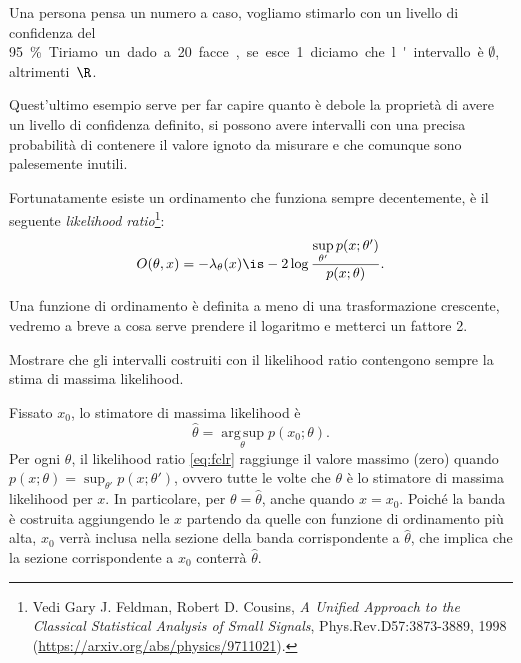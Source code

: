 \begin{example}
	Una persona pensa un numero a caso,
	vogliamo stimarlo con un livello di confidenza del \SI{95}\%.
	Tiriamo un dado a 20 facce,
	se esce 1 diciamo che l'intervallo è $\emptyset$, altrimenti~$\R$.
\end{example}

Quest'ultimo esempio serve per far capire quanto è debole la proprietà di
avere un livello di confidenza definito, si possono avere intervalli con una
precisa probabilità di contenere il valore ignoto da misurare e che comunque
sono palesemente inutili.

Fortunatamente esiste un ordinamento che funziona sempre decentemente, è il
seguente \emph{likelihood ratio}\footnote{Vedi Gary J. Feldman, Robert D. Cousins,
\emph{A Unified Approach to the Classical Statistical Analysis of Small
Signals}, Phys.Rev.D57:3873-3889, 1998
(\url{https://arxiv.org/abs/physics/9711021}).}:
%
\begin{equation} \label{eq:fclr}
	O(\theta,x) = -\lambda_\theta(x)
	\is -2\log\frac {\sup\limits_{\theta'} p(x;\theta')} {p(x;\theta)}.
\end{equation}

Una funzione di ordinamento è definita a meno di una trasformazione crescente,
vedremo a breve a cosa serve prendere il logaritmo e metterci un fattore 2.

\begin{exercise}
    Mostrare che gli intervalli costruiti con il likelihood ratio contengono
    sempre la stima di massima likelihood.
\end{exercise}

\begin{solution}
    Fissato $x_0$, lo stimatore di massima likelihood è
    \begin{equation*}
        \hat\theta = \operatorname*{arg\,sup}_\theta p(x_0;\theta).
    \end{equation*}
    Per ogni $\theta$, il likelihood ratio \eqref{eq:fclr} raggiunge il
    valore massimo (zero) quando $p(x;\theta) = \sup_{\theta'}p(x;\theta')$,
    ovvero tutte le volte che $\theta$ è lo stimatore di massima likelihood
    per $x$. In particolare, per $\theta = \hat\theta$, anche quando $x = x_0$.
    Poiché la banda è costruita aggiungendo le $x$ partendo da quelle con
    funzione di ordinamento più alta, $x_0$ verrà inclusa nella sezione della
    banda corrispondente a $\hat\theta$, che implica che la sezione
    corrispondente a $x_0$ conterrà $\hat\theta$.
\end{solution}

